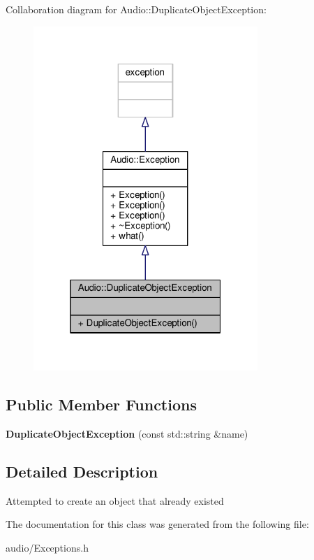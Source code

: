 Collaboration diagram for Audio\+:\+:Duplicate\+Object\+Exception\+:
\nopagebreak
\begin{figure}[H]
\begin{center}
\leavevmode
\includegraphics[width=241pt]{d5/d14/classAudio_1_1DuplicateObjectException__coll__graph}
\end{center}
\end{figure}
\subsection*{Public Member Functions}
\begin{DoxyCompactItemize}
\item 
{\bfseries Duplicate\+Object\+Exception} (const std\+::string \&name)\hypertarget{classAudio_1_1DuplicateObjectException_a521e292e810466f672cad87014cfaa67}{}\label{classAudio_1_1DuplicateObjectException_a521e292e810466f672cad87014cfaa67}

\end{DoxyCompactItemize}


\subsection{Detailed Description}
Attempted to create an object that already existed 

The documentation for this class was generated from the following file\+:\begin{DoxyCompactItemize}
\item 
audio/Exceptions.\+h\end{DoxyCompactItemize}
